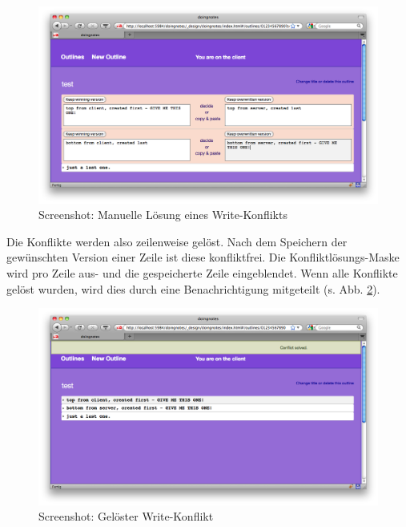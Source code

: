 \medskip
\begin{figure}[ht] 
  \begin{center}
  \includegraphics[width=\textwidth]{grafik/screenshot-write-conflict-solving} 
  \end{center}
  \caption{Screenshot: Manuelle Lösung eines Write-Konflikts}
  \label{fig:writeconflict-solving} 
\end{figure}

\afterpage{\clearpage}


Die Konflikte werden also zeilenweise gelöst. Nach dem Speichern der gewünschten Version einer Zeile ist diese konfliktfrei. Die Konfliktlösungs-Maske wird pro Zeile aus- und die gespeicherte Zeile eingeblendet. Wenn alle Konflikte gelöst wurden, wird dies durch eine Benachrichtigung mitgeteilt (s. Abb. \ref{fig:writeconflict-solved}).

\medskip
\begin{figure}[ht] 
  \begin{center}
  \includegraphics[width=\textwidth]{grafik/screenshot-write-conflict-solved} 
  \end{center}
  \caption{Screenshot: Gelöster Write-Konflikt}
  \label{fig:writeconflict-solved} 
\end{figure}





